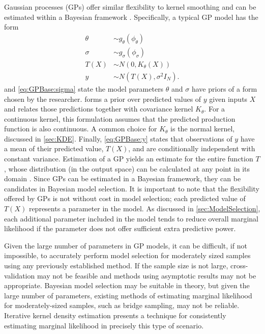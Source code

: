 \documentclass[twocolumn]{article}
\begin{document}
Gaussian processes (GPs) offer similar flexibility to kernel smoothing and can be estimated within a Bayesian framework \citep{Rasmussen}. Specifically, a typical GP model has the form
\begin{subequations}
\begin{align}
	\label{eq:GPBase:theta} \theta &\sim g_\theta(\phi_\theta)\\ 
	\label{eq:GPBase:sigma} \sigma &\sim g_\sigma(\phi_\sigma)\\ 
	\label{eq:GPBase:f} T(X) &\sim N(0, K_\theta(X))\\ 
	\label{eq:GPBase:y} y &\sim N(T(X), \sigma^2 I_N). 
\end{align}
\end{subequations}
 and \cref{eq:GPBase:sigma} state the model parameters $\theta$ and $\sigma$ have priors of a form chosen by the researcher.  forms a prior over predicted values of $y$ given inputs $X$ and relates those predictions together with covariance kernel $K_\theta$. For a continuous kernel, this formulation assumes that the predicted production function is also continuous. A common choice for $K_\theta$ is the normal kernel, discussed in \cref{sec:KDE}. Finally, \cref{eq:GPBase:y} states that observations of $y$ have a mean of their predicted value, $T(X)$, and are conditionally independent with constant variance. Estimation of a GP yields an estimate for the entire function $T$, whose distribution (in the output space) can be calculated at any point in its domain \citep{RasmussenWilliams}. Since GPs can be estimated in a Bayesian framework, they can be candidates in Bayesian model selection. It is important to note that the flexibility offered by GPs is not without cost in model selection; each predicted value of $T(X)$ represents a parameter in the model. As discussed in \cref{sec:ModelSelection}, each additional parameter included in the model tends to reduce overall marginal likelihood if the parameter does not offer sufficient extra predictive power.



Given the large number of parameters in GP models, it can be difficult, if not impossible, to accurately perform model selection for moderately sized samples using any previously established method. If the sample size is not large, cross-validation may not be feasible and methods using asymptotic results may not be appropriate. Bayesian model selection may be suitable in theory, but given the large number of parameters, existing methods of estimating marginal likelihood for moderately-sized samples, such as bridge sampling, may not be reliable. Iterative kernel density estimation presents a technique for consistently estimating marginal likelihood in precisely this type of scenario.
\end{document}

